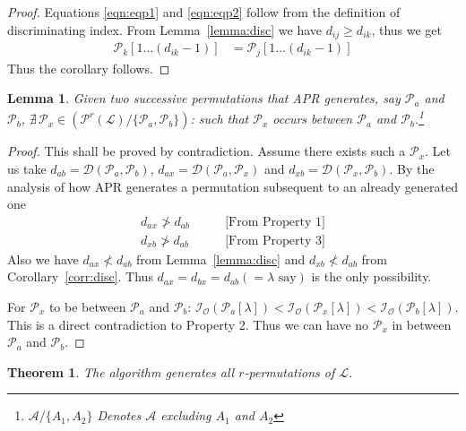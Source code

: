 \documentclass{article}
\newtheorem{theorem}[defn]{Theorem}
\newtheorem{lemma}[defn]{Lemma}
\begin{document}
\begin{proof}
 Equations \ref{eqn:eqp1} and \ref{eqn:eqp2} follow from the definition of discriminating index. From Lemma~\ref{lemma:disc} we have $d_{ij} \ge d_{ik}$, thus we get
\begin{align}
\mathcal{P}_{k}[1 \ldots (d_{ik} - 1)] &= \mathcal{P}_{j}[1 \ldots (d_{ik} - 1)] 
\end{align}
Thus the corollary follows. \end{proof}

\begin{lemma}
\label{lemma:nextperm}
 Given two successive permutations that APR generates, say $\mathcal{P}_a$ and $\mathcal{P}_b$, $\nexists\, \mathcal{P}_x \in \left(\mathcal{P}^r(\mathcal{L})/ \{\mathcal{P}_a,\mathcal{P}_b\}\right)$: such that $\mathcal{P}_x$ occurs between $\mathcal{P}_a$ and $\mathcal{P}_b$.\footnote{$\mathcal{A}/\{A_1,A_2\}$ Denotes $\mathcal{A}$ excluding $A_1$ and $A_2$}
\end{lemma}

\begin{proof}
This shall be proved by contradiction. Assume there exists such a $\mathcal{P}_x$. Let us take $d_{ab} = \mathcal{D}(\mathcal{P}_a,\mathcal{P}_b)$, $d_{ax} = \mathcal{D}(\mathcal{P}_a,\mathcal{P}_x)$ and $d_{xb} = \mathcal{D}(\mathcal{P}_x,\mathcal{P}_b)$. By the analysis of how APR generates a permutation subsequent to an already generated one
\begin{align}
 d_{ax} \ngtr d_{ab} \qquad &\text{[From Property 1]} \\
 d_{xb} \ngtr d_{ab} \qquad &\text{[From Property 3]}
\end{align}
 Also we have $d_{ax} \nless d_{ab}$ from Lemma~\ref{lemma:disc} and $d_{xb} \nless d_{ab}$ from Corollary~\ref{corr:disc}. Thus $d_{ax} = d_{bx} = d_{ab} (= \lambda\text{ say})$ is the only possibility.

For $\mathcal{P}_x$ to be between $\mathcal{P}_a$ and $\mathcal{P}_b$: $\mathcal{I}_{\mathcal{O}}(\mathcal{P}_a[\lambda]) < \mathcal{I}_{\mathcal{O}}(\mathcal{P}_x[\lambda]) < \mathcal{I}_{\mathcal{O}}(\mathcal{P}_b[\lambda])$. This is a direct contradiction to Property 2. Thus we can have no $\mathcal{P}_x$ in between $\mathcal{P}_a$ and $\mathcal{P}_b$. \end{proof}

\begin{theorem}
 The algorithm generates all $r$-permutations of $\mathcal{L}$.
\end{theorem}
\end{document}
